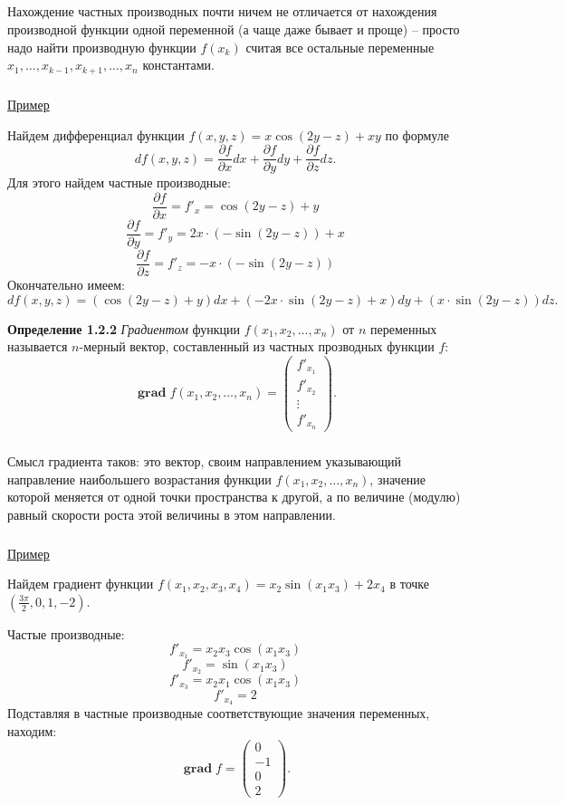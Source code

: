 \documentclass[12pt,a4paper]{article}
\DeclareMathOperator{\grad}{\textbf{grad}}
\begin{document}
\subparagraph{}
Нахождение частных производных почти ничем не отличается от нахождения производной функции одной переменной (а чаще даже бывает и проще) -- просто надо найти производную функции $f(x_k)$ считая все
остальные переменные $ x_1, \ldots, x_{k - 1}, x_{k + 1}, \ldots, x_n$ константами.

\subparagraph{}
\underline{Пример}

Найдем дифференциал функции $f(x, y, z) = x \cos(2y - z) + xy$ по формуле
\[ df(x, y, z) = \frac{\partial f}{\partial x}dx + \frac{\partial f}{\partial y}dy + \frac{\partial f}{\partial z}dz. \]
Для этого найдем частные производные:
\[ \frac{\partial f}{\partial x} = f'_x =  \cos(2y - z) + y \]
\[ \frac{\partial f}{\partial y} = f'_y = 2x \cdot (- \sin(2y - z)) + x\]
\[ \frac{\partial f}{\partial z} = f'_z =  -x \cdot (- \sin(2y - z)) \]
Окончательно имеем:
\[ df(x, y, z) =  (\cos(2y - z) + y)dx + (-2x \cdot \sin(2y - z) + x)dy + (x \cdot \sin(2y - z))dz. \]

\textbf{Определение 1.2.2} 
\textit{Градиентом} функции $f(x_1, x_2, \ldots, x_n)$ от $n$ переменных называется $n$-мерный вектор, составленный из частных прозводных функции $f$:
\[\grad f(x_1, x_2, \ldots, x_n) = \begin{pmatrix}
f'_{x_1} \\
f'_{x_2} \\
\vdots \\
f'_{x_n}
\end{pmatrix}.
\]

\subparagraph{}
Смысл градиента таков: это вектор, своим направлением указывающий направление наибольшего возрастания функции $f(x_1, x_2, \ldots, x_n)$, значение которой меняется от одной точки пространства к другой, а по величине (модулю) равный скорости роста этой величины в этом направлении.

\subparagraph{}
\underline{Пример}

Найдем градиент функции $f(x_1, x_2, x_3, x_4) = x_2 \sin(x_1 x_3) + 2x_4$ в точке $(\frac{3 \pi}{2}, 0, 1, -2)$.

Частые производные:
\[ f'_{x_1} = x_2 x_3 \cos(x_1 x_3)\]
\[ f'_{x_2} = \sin(x_1 x_3)\]
\[ f'_{x_3} = x_2 x_1 \cos(x_1 x_3)\]
\[ f'_{x_4} = 2\]
Подставляя в частные производные соответствующие значения переменных, находим:
\[ \grad f = \begin{pmatrix}
0 \\
-1 \\
0 \\
2
\end{pmatrix}.
\]
\end{document}
